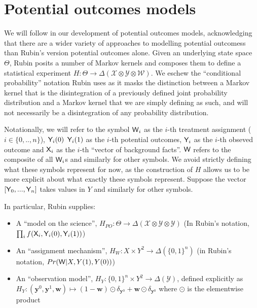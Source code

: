 
\section{Potential outcomes models}

We will follow \cite{rubin_causal_2005} in our development of potential outcomes models, acknowledging that there are a wider variety of approaches to modelling potential outcomess than Rubin's version potential outcomes alone. Given an underlying state space $\Theta$, Rubin posits a number of Markov kernels and composes them to define a statistical experiment $H:\Theta\to \Delta(\mathcal{X}\otimes\mathcal{Y}\otimes \mathcal{W})$. We eschew the ``conditional probability'' notation Rubin uses as it masks the distinction between a Markov kernel that is the disintegration of a previously defined joint probability distribution and a Markov kernel that we are simply defining as such, and will not necessarily be a disintegration of any probability distribution.

Notationally, we will refer to the symbol $\mathsf{W}_i$ as the $i$-th treatment assignment ($i\in \{0,..,n\}$), $\mathsf{Y}_i(0)$ $\mathsf{Y}_i(1)$ as the $i$-th potential outcomes, $\mathsf{Y}_i$ as the $i$-th obseved outcome and $\mathsf{X}_i$ as the $i$-th ``vector of background facts''. $\mathsf{W}$ refers to the composite of all $\mathsf{W}_i$s and similarly for other symbols. We avoid strictly defining what these symbols represent for now, as the construction of $H$ allows us to be more explicit about what exactly these symbols represent. Suppose the vector $[\mathsf{Y}_0,...,\mathsf{Y}_n]$ takes values in $Y$ and similarly for other symbols.

In particular, Rubin supplies:
\begin{itemize}
\item A ``model on the science'', $H_{PO}:\Theta \to \Delta(\mathcal{X}\otimes\mathcal{Y}\otimes\mathcal{Y})$ (In Rubin's notation, $\prod_i f(\mathsf{X}_i,\mathsf{Y}_i(0),\mathsf{Y}_i(1))$)
\item An ``assignment mechanism'', $H_W:X\times Y^2 \to \Delta(\{0,1\}^n)$ (in Rubin's notation, $Pr(\mathsf{W}|X,Y(1),Y(0))$)
\item An ``observation model'', $H_Y:\{0,1\}^n\times Y^2\to \Delta(\mathcal{Y})$, defined explicitly as $H_Y:(\mathbf{y}^0,\mathbf{y}^1,\mathbf{w})\mapsto (1-\mathbf{w}) \odot \delta_{\mathbf{y}^0} + \mathbf{w} \odot \delta_{\mathbf{y}^0}$ where $\odot$ is the elementwise product
\end{itemize}

